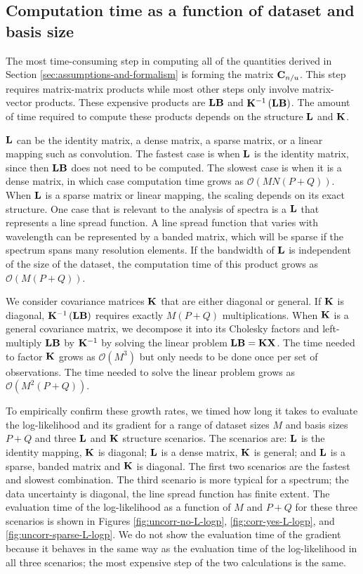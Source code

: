 \documentclass[manuscript]{aastex62}
\newcommand{\vx}[1]{{\bf {#1}}}
\begin{document}
\subsection{Computation time as a function of dataset and basis size}
\label{subsec:scaling}
The most time-consuming step in computing all of the quantities derived in Section \ref{sec:assumptions-and-formalism} is forming the matrix $\vx{C}_{n/u}$.
This step requires matrix-matrix products while most other steps only involve matrix-vector products.
These expensive products are $\vx{L}\vx{B}$ and $\vx{K}^{-1} \left(\vx{L} \vx{B}\right)$.
The amount of time required to compute these products depends on the structure $\vx{L}$ and $\vx{K}$.

$\vx{L}$ can be the identity matrix, a dense matrix, a sparse matrix, or a linear mapping such as convolution.
The fastest case is when $\vx{L}$ is the identity matrix, since then $\vx{L}\vx{B}$ does not need to be computed.
The slowest case is when it is a dense matrix, in which case computation time grows as $\mathcal{O}(MN(P+Q))$.
When $\vx{L}$ is a sparse matrix or linear mapping, the scaling depends on its exact structure.
One case that is relevant to the analysis of spectra is a $\vx{L}$ that represents a line spread function.
A line spread function that varies with wavelength can be represented by a banded matrix, which will be sparse if the spectrum spans many resolution elements.
If the bandwidth of $\vx{L}$ is independent of the size of the dataset, the computation time of this product grows as $\mathcal{O}(M(P+Q))$.

We consider covariance matrices $\vx{K}$ that are either diagonal or general.
If $\vx{K}$ is diagonal, $\vx{K}^{-1} \left(\vx{L} \vx{B}\right)$ requires exactly $M(P+Q)$ multiplications.
When $\vx{K}$ is a general covariance matrix, we decompose it into its Cholesky factors and left-multiply $\vx{L} \vx{B}$ by $\vx{K}^{-1}$ by solving the linear problem $\vx{\vx{L} \vx{B}} = \vx{K} \vx{X}$.
The time needed to factor $\vx{K}$ grows as $\mathcal{O}\left(M^3\right)$ but only needs to be done once per set of observations.
The time needed to solve the linear problem grows as $\mathcal{O}\left(M^2 (P+Q)\right)$.

To empirically confirm these growth rates, we timed how long it takes to evaluate the log-likelihood and its gradient for a range of dataset sizes $M$ and basis sizes $P+Q$ and three $\vx{L}$ and $\vx{K}$ structure scenarios.
The scenarios are: $\vx{L}$ is the identity mapping, $\vx{K}$ is diagonal; $\vx{L}$ is a dense matrix, $\vx{K}$ is general; and $\vx{L}$ is a sparse, banded matrix and $\vx{K}$ is diagonal.
The first two scenarios are the fastest and slowest combination.
The third scenario is more typical for a spectrum; the data uncertainty is diagonal, the line spread function has finite extent.
The evaluation time of the log-likelihood as a function of $M$ and $P+Q$ for these three scenarios is shown in Figures \ref{fig:uncorr-no-L-logp}, \ref{fig:corr-yes-L-logp}, and \ref{fig:uncorr-sparse-L-logp}.
We do not show the evaluation time of the gradient because it behaves in the same way as the evaluation time of the log-likelihood in all three scenarios; the most expensive step of the two calculations is the same.
\end{document}

